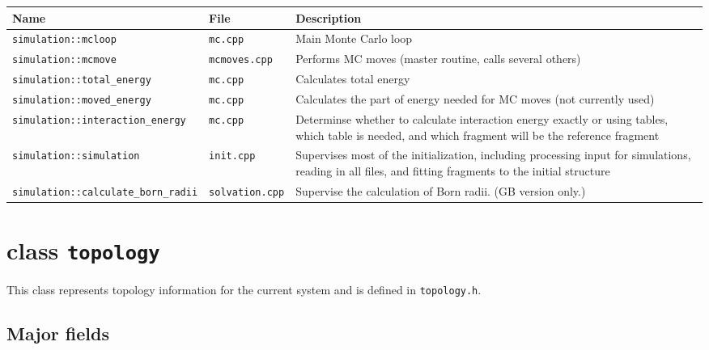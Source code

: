 \documentclass{article}      %
\begin{document}
\begin{tabular}{|p{7cm}|p{3cm}|p{6cm}|}
\hline
Name & File & Description \\
\hline
\verb+simulation::mcloop+ & \verb+mc.cpp+ & Main Monte Carlo loop \\
\hline
\verb+simulation::mcmove+ & \verb+mcmoves.cpp+ & Performs MC moves (master routine, calls several others) \\
\hline
\verb+simulation::total_energy+ &  \verb+mc.cpp+& Calculates total energy \\
\hline
\verb+simulation::moved_energy+ & \verb+mc.cpp+ & Calculates the part of energy needed for MC moves (not currently used) \\
\hline
\verb+simulation::interaction_energy+ &  \verb+mc.cpp+ & Determinse whether to calculate interaction energy exactly or using tables, which table is needed, and which fragment will be the reference fragment \\
\hline
\verb+simulation::simulation+ & \verb+init.cpp+ & Supervises most of the initialization, including processing input for simulations, reading in all files, and fitting fragments to the initial structure\\
\hline
\verb+simulation::calculate_born_radii+ & \verb+solvation.cpp+ & Supervise the calculation of Born radii. (GB version only.) \\
\hline
\end{tabular}

\section{class \texttt{topology}}

This class represents topology information for the current system and is defined in \verb+topology.h+.  

\subsection{Major fields}
\end{document}
